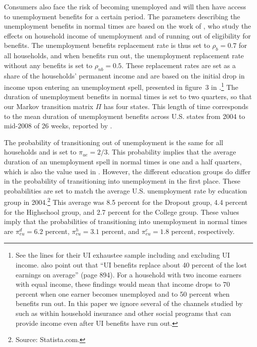 \documentclass[\econtexRoot/HAFiscal]{subfiles}
\begin{document}
Consumers also face the risk of becoming unemployed and will then have access to unemployment benefits for a certain period. The parameters describing the unemployment benefits in normal times are based on the work of \cite{rothstein2017scraping}, who study the effects on household income of unemployment and of running out of eligibility for benefits. The unemployment benefits replacement rate is thus set to $\rho_b=0.7$ for all households, and when benefits run out, the unemployment replacement rate without any benefits is set to $\rho_{nb}=0.5$. These replacement rates are set as a share of the households' permanent income and are based on the initial drop in income upon entering an unemployment spell, presented in figure~3 in \cite{rothstein2017scraping}.\footnote{See the lines for their UI exhaustee sample including and excluding UI income. \cite{rothstein2017scraping} also point out that ``UI benefits replace about 40 percent of the lost earnings on average'' (page 894). For a household with two income earners with equal income, these findings would mean that income drops to 70 percent when one earner becomes unemployed and to 50 percent when benefits run out. In this paper we ignore several of the channels studied by \cite{rothstein2017scraping} such as within household insurance and other social programs that can provide income even after UI benefits have run out.} The duration of unemployment benefits in normal times is set to two quarters, so that our Markov transition matrix $\Pi$ has four states. This length of time corresponds to the mean duration of unemployment benefits across U.S. states from 2004 to mid-2008 of 26 weeks, reported by \cite{rothstein2017scraping}. 

The probability of transitioning out of unemployment is the same for all households and is set to $\pi_{ue}=2/3$. This probability implies that the average duration of an unemployment spell in normal times is one and a half quarters, which is also the value used in \cite{carroll2020modeling}. However, the different education groups do differ in the probability of transitioning into unemployment in the first place. These probabilities are set to match the average U.S. unemployment rate by education group in 2004.\footnote{Source: Statista.com.} This average was 8.5 percent for the Dropout group, 4.4 percent for the Highschool group, and 2.7 percent for the College group. These values imply that the probabilities of transitioning into unemployment in normal times are $\pi_{eu}^d=6.2$ percent, $\pi_{eu}^h=3.1$ percent, and $\pi_{eu}^c=1.8$ percent, respectively. 
\end{document}
